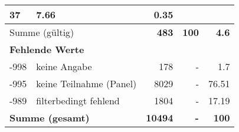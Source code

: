 \begin{longtable}{lXrrr}
       \num{37} &
       \num[round-mode=places,round-precision=2]{7,66} &
         \num[round-mode=places,round-precision=2]{0,35} \\
     \midrule
     \multicolumn{2}{l}{Summe (gültig)} &
       \textbf{\num{483}} &
     \textbf{100} &
       \textbf{\num[round-mode=places,round-precision=2]{4,6}} \\
     \multicolumn{5}{l}{\textbf{Fehlende Werte}}\\
       -998 &
       keine Angabe &
         \num{178} &
        - &
         \num[round-mode=places,round-precision=2]{1,7} \\
       -995 &
       keine Teilnahme (Panel) &
         \num{8029} &
        - &
         \num[round-mode=places,round-precision=2]{76,51} \\
       -989 &
       filterbedingt fehlend &
         \num{1804} &
        - &
         \num[round-mode=places,round-precision=2]{17,19} \\
     \midrule
     \multicolumn{2}{l}{\textbf{Summe (gesamt)}} &
          \textbf{\num{10494}} &
        \textbf{-} &
        \textbf{100} \\
     \bottomrule
     \end{longtable}
     
